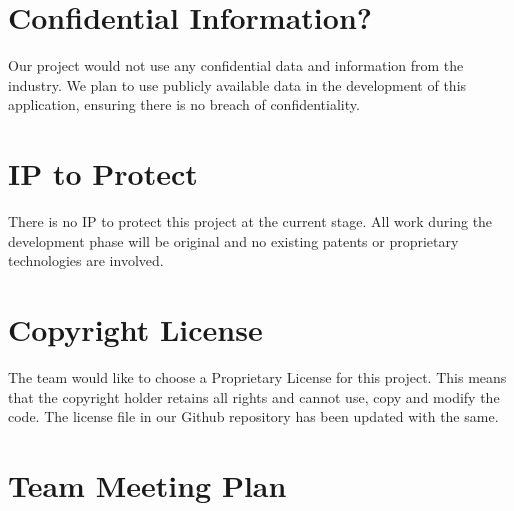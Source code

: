 \documentclass{article}
\begin{document}

\section{Confidential Information?}

Our project would not use any confidential data and information from the industry. We plan to use publicly available data in the development of this application, ensuring there is no breach of confidentiality.

\section{IP to Protect}

There is no IP to protect this project at the current stage. All work during the development phase will be original and no existing patents or proprietary technologies are involved. 

\section{Copyright License}


The team would like to choose a Proprietary License for this project. This means that the copyright holder retains all rights and cannot use, copy and modify the code. The license file in our Github repository has been updated with the same.

\section{Team Meeting Plan}





\end{document}
